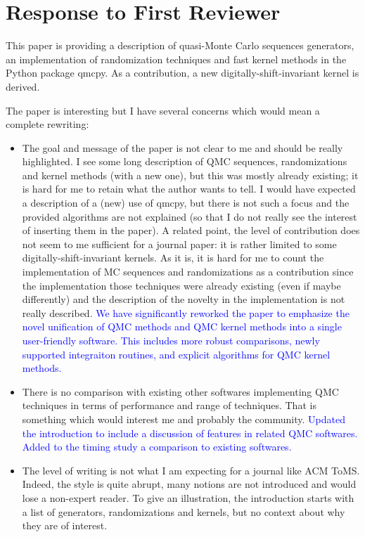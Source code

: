 \documentclass{article}
\newcommand{\response}[1]{{\newline \textcolor{blue}{#1}}}
\begin{document}
\section{Response to First Reviewer} 

This paper is providing a description of quasi-Monte Carlo sequences generators, an implementation of randomization techniques and fast kernel methods in the Python package qmcpy. As a contribution, a new digitally-shift-invariant kernel is derived.

The paper is interesting but I have several concerns which would mean a complete rewriting:
\begin{itemize} 
    \item The goal and message of the paper is not clear to me and should be really highlighted. I see some long description of QMC sequences, randomizations and kernel methods (with a new one), but this was mostly already existing; it is hard for me to retain what the author wants to tell. I would have expected a description of a (new) use of qmcpy, but there is not such a focus and the provided algorithms are not explained (so that I do not really see the interest of inserting them in the paper). \newline 
    A related point, the level of contribution does not seem to me sufficient for a journal paper: it is rather limited to some digitally-shift-invariant kernels. As it is, it is hard for me to count the implementation of MC sequences and randomizations as a contribution since the implementation those techniques were already existing (even if maybe differently) and the description of the novelty in the implementation is not really described.
    \response{We have significantly reworked the paper to emphasize the novel unification of QMC methods and QMC kernel methods into a single user-friendly software. This includes more robust comparisons, newly supported integraiton routines, and explicit algorithms for QMC kernel methods.}
    \item There is no comparison with existing other softwares implementing QMC techniques in terms of performance and range of techniques. That is something which would interest me and probably the community.
    \response{Updated the introduction to include a discussion of features in related QMC softwares. Added to the timing study a comparison to existing softwares.} 
    \item The level of writing is not what I am expecting for a journal like ACM ToMS. Indeed, the style is quite abrupt, many notions are not introduced and would lose a non-expert reader. To give an illustration, the introduction starts with a list of generators, randomizations and kernels, but no context about why they are of interest.

\end{itemize}
\end{document}
